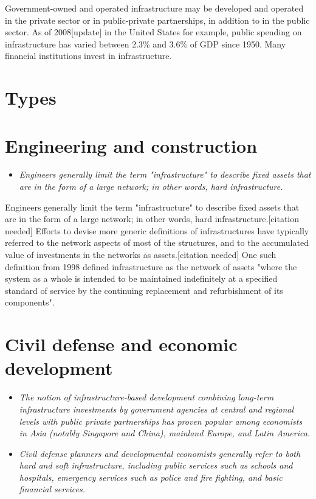 Government-owned and operated infrastructure may be developed and
operated in the private sector or in public-private partnerships, in
addition to in the public sector. As of 2008{[}update{]} in the United
States for example, public spending on infrastructure has varied between
2.3\% and 3.6\% of GDP since 1950. Many financial institutions invest in
infrastructure.

\section{Types}\label{types}

\section{Engineering and
construction}\label{engineering-and-construction}

\begin{itemize}
\item
  \emph{Engineers generally limit the term "infrastructure" to describe
  fixed assets that are in the form of a large network; in other words,
  hard infrastructure.}
\end{itemize}

Engineers generally limit the term "infrastructure" to describe fixed
assets that are in the form of a large network; in other words, hard
infrastructure.{[}citation needed{]} Efforts to devise more generic
definitions of infrastructures have typically referred to the network
aspects of most of the structures, and to the accumulated value of
investments in the networks as assets.{[}citation needed{]} One such
definition from 1998 defined infrastructure as the network of assets
"where the system as a whole is intended to be maintained indefinitely
at a specified standard of service by the continuing replacement and
refurbishment of its components".

\section{Civil defense and economic
development}\label{civil-defense-and-economic-development}

\begin{itemize}
\item
  \emph{The notion of infrastructure-based development combining
  long-term infrastructure investments by government agencies at central
  and regional levels with public private partnerships has proven
  popular among economists in Asia (notably Singapore and China),
  mainland Europe, and Latin America.}
\item
  \emph{Civil defense planners and developmental economists generally
  refer to both hard and soft infrastructure, including public services
  such as schools and hospitals, emergency services such as police and
  fire fighting, and basic financial services.}
\end{itemize}

